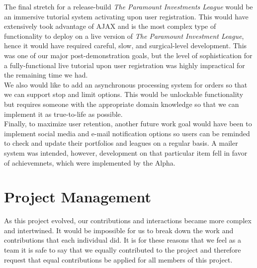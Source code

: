 The final stretch for a release-build \textit{The Paramount Investments League}
would be an immersive tutorial system activating upon user registration. This
would have extensively took advantage of AJAX and is the most complex type of
functionality to deploy on a live version of \textit{The Paramount Investment
League}, hence it would have required careful, slow, and surgical-level
development. This was one of our major post-demonstration goals, but the
level of sophistication for a fully-functional live tutorial upon user
registration was highly impractical for the remaining time we had.\\

We also would like to add an asynchronous processing system for orders so that
we can support stop and limit options. This would be unlockable functionality
but requires someone with the appropriate domain knowledge so that we can
implement it as true-to-life as possible.\\

Finally, to maximize user retention, another future work goal would have been
to implement social media and e-mail notification options so users can be
reminded to check and update their portfolios and leagues on a regular basis. A
mailer system was intended, however, development on that particular item fell
in favor of achievemnets, which were implemented by the Alpha.\\

\newpage

\section{Project Management}

As this project evolved, our contributions and interactions became more
complex and intertwined. It would be impossible for us to break down the work
and contributions that each individual did. It is for these reasons that we
feel as a team it is safe to say that we equally contributed to the project
and therefore request that equal contributions be applied for all members of
this project.
